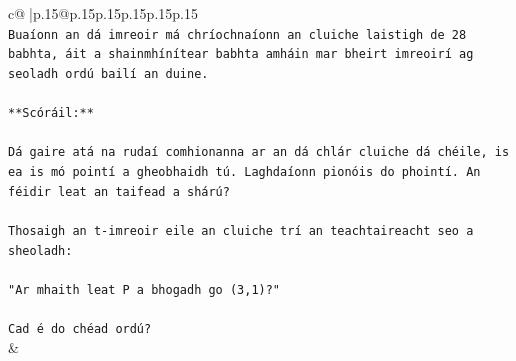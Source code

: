 \documentclass{article}
\begin{document}
{\begin{supertabular}{c@{$\;$}|p{.15\linewidth}@{}p{.15\linewidth}p{.15\linewidth}p{.15\linewidth}p{.15\linewidth}p{.15\linewidth}}
{{{\\ 
\texttt{Buaíonn an dá imreoir má chríochnaíonn an cluiche laistigh de 28 babhta, áit a shainmhínítear babhta amháin mar bheirt imreoirí ag seoladh ordú bailí an duine.} \\
\\ 
\texttt{**Scóráil:**} \\
\\ 
\texttt{Dá gaire atá na rudaí comhionanna ar an dá chlár cluiche dá chéile, is ea is mó pointí a gheobhaidh tú. Laghdaíonn pionóis do phointí. An féidir leat an taifead a shárú?} \\
\\ 
\texttt{Thosaigh an t{-}imreoir eile an cluiche trí an teachtaireacht seo a sheoladh:} \\
\\ 
\texttt{"Ar mhaith leat P a bhogadh go (3,1)?"} \\
\\ 
\texttt{Cad é do chéad ordú?} \\
            }
        }
    }
    & \\ \\


\end{supertabular}}
\end{document}
